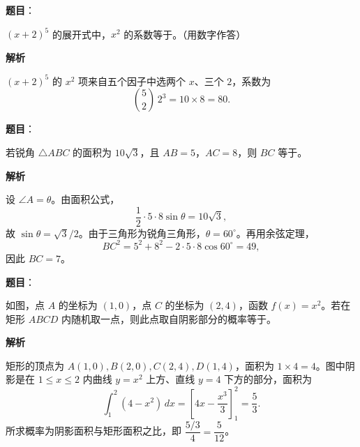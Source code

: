 \begin{answer}

\textbf{题目}：

$(x+2)^5$ 的展开式中，$x^2$ 的系数等于\gkblank{}。（用数字作答）

\textbf{解析}

$(x+2)^5$ 的 $x^2$ 项来自五个因子中选两个 $x$、三个 $2$，系数为
\nopagebreak[4]
\[
\binom52\,2^3=10\times8=80.
\]


\end{answer}
\begin{answer}

\textbf{题目}：

若锐角 $\triangle ABC$ 的面积为 $10\sqrt3$，且 $AB=5$，$AC=8$，则 $BC$ 等于\gkblank{}。

\textbf{解析}

设 $\angle A=\theta$。由面积公式，
\nopagebreak[4]
\[
\frac12\cdot5\cdot8\sin\theta=10\sqrt3,
\]
故 $\sin\theta=\sqrt3/2$。由于三角形为锐角三角形，$\theta=60^\circ$。再用余弦定理，
\nopagebreak[4]
\[
BC^2=5^2+8^2-2\cdot5\cdot8\cos60^\circ=49,
\]
因此 $BC=7$。


\end{answer}
\begin{answer}

\textbf{题目}：

如图，点 $A$ 的坐标为 $(1,0)$，点 $C$ 的坐标为 $(2,4)$，函数 $f(x)=x^2$。若在矩形 $ABCD$ 内随机取一点，则此点取自阴影部分的概率等于\gkblank{}。
\nopagebreak[4]
\begin{center}\end{center}
\nopagebreak[4]
\textbf{解析}

矩形的顶点为 $A(1,0),B(2,0),C(2,4),D(1,4)$，面积为 $1\times4=4$。图中阴影是在 $1\leqslant x\leqslant2$ 内曲线 $y=x^2$ 上方、直线 $y=4$ 下方的部分，面积为
\nopagebreak[4]
\[
\int_1^2(4-x^2)\,dx
=\left[4x-\frac{x^3}{3}\right]_1^2
=\frac53.
\]
所求概率为阴影面积与矩形面积之比，即 $\dfrac{5/3}{4}=\dfrac5{12}$。


\end{answer}
